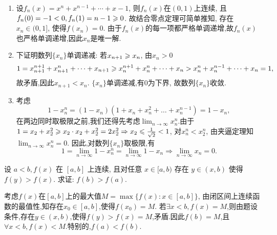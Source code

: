 \begin{solution}
    \begin{enumerate}
        \item 设$f_n(x) = x^n + x^{n-1} + \cdots + x - 1$, 则$f_n(x)$在$(0,1)$上连续, 且$f_n(0) = -1 < 0, f_n(1) = n-1 \geqslant 0$. 故结合零点定理可简单推知, 存在$x_n \in (0,1]$, 使得$f(x_n) = 0$. 由于$f_n(x)$的每一项都严格单调递增,故$f_n(x)$也严格单调递增,因此$x_n$是唯一解.
        \item 下证明数列$\{x_n\}$单调递减:
        若$x_{n+1} \geqslant x_n$, 由$x_n > 0$
        $$1 = x_{n+1}^{n+1} + x_{n+1}^n + \dots + x_{n+1} \geqslant x_n^{n+1} + x_n^n + \dots + x_n > x_n^n + x_n^{n-1} + \dots + x_n = 1,$$故矛盾,因此$x_{n+1} < x_n$. $\{x_n\}$单调递减,有$0$为下界, 故数列$\{x_n\}$收敛.
        \item 考虑$$1-x_n^n = (1-x_n)(1+x_n+x_n^2+\dots+x_n^{n-1}) = 1-x_n,$$在两边同时取极限之前,我们还得先考虑$\lim_{n \to \infty} x_n^n$.由于$1 = x_2 + x_2^2 \geqslant x_2 \cdot x_2 + x_2^2 = 2x_2^2 \Rightarrow x_2 \leqslant \frac{1}{\sqrt{2}} < 1$, 对$x_n^n < x_2^n$, 由夹逼定理知$\lim_{n \to \infty} x_n^n = 0$. 因此,对数列$\{x_n\}$取极限,有
    $$1 = \lim_{n \to \infty} 1 - x_n^n = \lim_{n \to \infty} 1 - x_n \Rightarrow \lim_{n \to \infty} x_n = 0.$$
    \end{enumerate}

    
\end{solution}

\begin{exercise}[2.C.10]
    设 $a<b, f(x)$ 在 $[a,b]$ 上连续, 且对任意 $x \in [a,b)$ 存在 $y \in (x,b)$ 使得 $f(y)>f(x)$. 求证: $f(b)>f(a)$.
\end{exercise}

\begin{solution}
    考虑$f(x)$在$[a,b]$上的最大值$M = \max \{ f(x): x \in [a,b] \}$, 由闭区间上连续函数的最值性,知存在$x_0 \in [a,b]$,使得$f(x_0) = M$. 若$\exists x < b, f(x) =M$,则由题设条件,存在$y \in (x,b)$,使得$f(y) > f(x) = M$,矛盾.因此$f(b) = M$,且$\forall x < b, f(x) <M$.特别的,$f(a) < f(b)$.
\end{solution}

\newpage